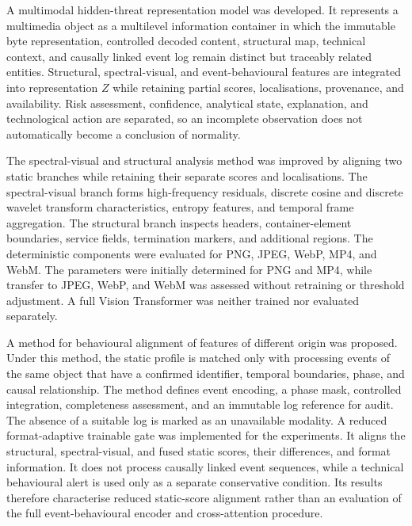 A multimodal hidden-threat representation model was developed. It represents a multimedia object as a multilevel information container in which the immutable byte representation, controlled decoded content, structural map, technical context, and causally linked event log remain distinct but traceably related entities. Structural, spectral-visual, and event-behavioural features are integrated into representation $Z$ while retaining partial scores, localisations, provenance, and availability. Risk assessment, confidence, analytical state, explanation, and technological action are separated, so an incomplete observation does not automatically become a conclusion of normality.

The spectral-visual and structural analysis method was improved by aligning two static branches while retaining their separate scores and localisations. The spectral-visual branch forms high-frequency residuals, discrete cosine and discrete wavelet transform characteristics, entropy features, and temporal frame aggregation. The structural branch inspects headers, container-element boundaries, service fields, termination markers, and additional regions. The deterministic components were evaluated for PNG, JPEG, WebP, MP4, and WebM. The parameters were initially determined for PNG and MP4, while transfer to JPEG, WebP, and WebM was assessed without retraining or threshold adjustment. A full Vision Transformer was neither trained nor evaluated separately.

A method for behavioural alignment of features of different origin was proposed. Under this method, the static profile is matched only with processing events of the same object that have a confirmed identifier, temporal boundaries, phase, and causal relationship. The method defines event encoding, a phase mask, controlled integration, completeness assessment, and an immutable log reference for audit. The absence of a suitable log is marked as an unavailable modality. A reduced format-adaptive trainable gate was implemented for the experiments. It aligns the structural, spectral-visual, and fused static scores, their differences, and format information. It does not process causally linked event sequences, while a technical behavioural alert is used only as a separate conservative condition. Its results therefore characterise reduced static-score alignment rather than an evaluation of the full event-behavioural encoder and cross-attention procedure.

